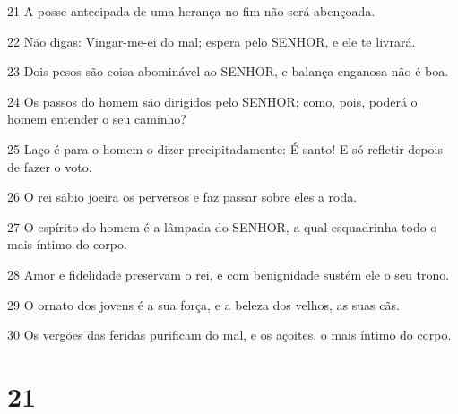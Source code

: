 \par 21 A posse antecipada de uma herança no fim não será abençoada.
\par 22 Não digas: Vingar-me-ei do mal; espera pelo SENHOR, e ele te livrará.
\par 23 Dois pesos são coisa abominável ao SENHOR, e balança enganosa não é boa.
\par 24 Os passos do homem são dirigidos pelo SENHOR; como, pois, poderá o homem entender o seu caminho?
\par 25 Laço é para o homem o dizer precipitadamente: É santo! E só refletir depois de fazer o voto.
\par 26 O rei sábio joeira os perversos e faz passar sobre eles a roda.
\par 27 O espírito do homem é a lâmpada do SENHOR, a qual esquadrinha todo o mais íntimo do corpo.
\par 28 Amor e fidelidade preservam o rei, e com benignidade sustém ele o seu trono.
\par 29 O ornato dos jovens é a sua força, e a beleza dos velhos, as suas cãs.
\par 30 Os vergões das feridas purificam do mal, e os açoites, o mais íntimo do corpo.

\chapter{21}

